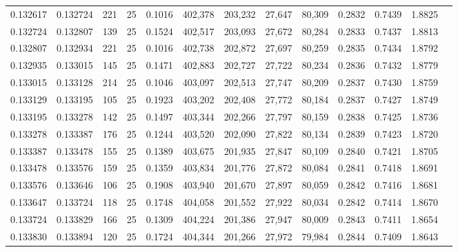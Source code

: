 \begin{tabular}{rrrrrrrrrrrrr}
0.132617 & 0.132724 &   221 &  25 &                                     0.1016 & 402,378 & 203,232 &  27,647 &  80,309 & 0.2832 & 0.7439 & 1.8825 \\
0.132724 & 0.132807 &   139 &  25 &                                     0.1524 & 402,517 & 203,093 &  27,672 &  80,284 & 0.2833 & 0.7437 & 1.8813 \\
0.132807 & 0.132934 &   221 &  25 &                                     0.1016 & 402,738 & 202,872 &  27,697 &  80,259 & 0.2835 & 0.7434 & 1.8792 \\
0.132935 & 0.133015 &   145 &  25 &                                     0.1471 & 402,883 & 202,727 &  27,722 &  80,234 & 0.2836 & 0.7432 & 1.8779 \\
0.133015 & 0.133128 &   214 &  25 &                                     0.1046 & 403,097 & 202,513 &  27,747 &  80,209 & 0.2837 & 0.7430 & 1.8759 \\
0.133129 & 0.133195 &   105 &  25 &                                     0.1923 & 403,202 & 202,408 &  27,772 &  80,184 & 0.2837 & 0.7427 & 1.8749 \\
0.133195 & 0.133278 &   142 &  25 &                                     0.1497 & 403,344 & 202,266 &  27,797 &  80,159 & 0.2838 & 0.7425 & 1.8736 \\
0.133278 & 0.133387 &   176 &  25 &                                     0.1244 & 403,520 & 202,090 &  27,822 &  80,134 & 0.2839 & 0.7423 & 1.8720 \\
0.133387 & 0.133478 &   155 &  25 &                                     0.1389 & 403,675 & 201,935 &  27,847 &  80,109 & 0.2840 & 0.7421 & 1.8705 \\
0.133478 & 0.133576 &   159 &  25 &                                     0.1359 & 403,834 & 201,776 &  27,872 &  80,084 & 0.2841 & 0.7418 & 1.8691 \\
0.133576 & 0.133646 &   106 &  25 &                                     0.1908 & 403,940 & 201,670 &  27,897 &  80,059 & 0.2842 & 0.7416 & 1.8681 \\
0.133647 & 0.133724 &   118 &  25 &                                     0.1748 & 404,058 & 201,552 &  27,922 &  80,034 & 0.2842 & 0.7414 & 1.8670 \\
0.133724 & 0.133829 &   166 &  25 &                                     0.1309 & 404,224 & 201,386 &  27,947 &  80,009 & 0.2843 & 0.7411 & 1.8654 \\
0.133830 & 0.133894 &   120 &  25 &                                     0.1724 & 404,344 & 201,266 &  27,972 &  79,984 & 0.2844 & 0.7409 & 1.8643 \\

\end{tabular}
